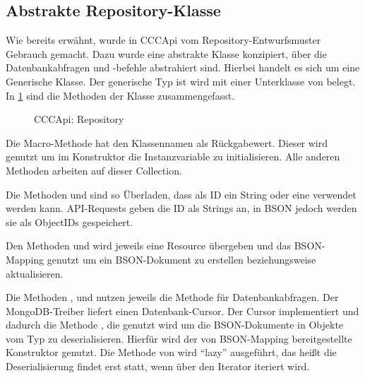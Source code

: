 \subsection{Abstrakte Repository-Klasse}
\label{ssec:ba_abstrakte_repository_klasse}

Wie bereits erwähnt, wurde in CCCApi vom Repository-Entwurfsmuster Gebrauch
gemacht.  Dazu wurde eine abstrakte Klasse  konzipiert, über
die Datenbankabfragen und -befehle abstrahiert sind.  Hierbei handelt es sich
um eine Generische Klasse.  Der generische Typ  ist wird mit einer
Unterklasse von  belegt.  In
\cref{fig:cccapi_repository} sind die Methoden der Klasse zusammengefasst.

\begin{figure}
	\centering
	
	\caption{CCCApi: Repository}
	\label{fig:cccapi_repository}
\end{figure}

Die Macro-Methode  hat den Klassennamen als
Rückgabewert.  Dieser wird genutzt um im Konstruktor die Instanzvariable
 zu initialisieren.  Alle anderen Methoden arbeiten auf
dieser Collection.

Die Methoden  und  sind so Überladen, dass
als ID ein String oder eine  verwendet werden kann.
API-Requests geben die ID als Strings an, in BSON jedoch werden sie als
ObjectIDs gespeichert.

Den Methoden  und  wird jeweils
eine Resource übergeben und das BSON-Mapping genutzt um ein BSON-Dokument zu
erstellen beziehungsweise aktualisieren.

Die Methoden ,  und  nutzen
jeweils die Methode  für Datenbankabfragen.  Der
MongoDB-Treiber liefert  einen Datenbank-Cursor.  Der
Cursor implementiert  und dadurch die Methode
, die genutzt wird um die BSON-Dokumente in Objekte vom Typ
 zu deserialisieren.  Hierfür wird der von BSON-Mapping bereitgestellte
Konstruktor  genutzt.  Die Methode 
von  wird \enquote{lazy} ausgeführt, das heißt die
Deserialisierung findet erst statt, wenn über den Iterator iteriert wird.
